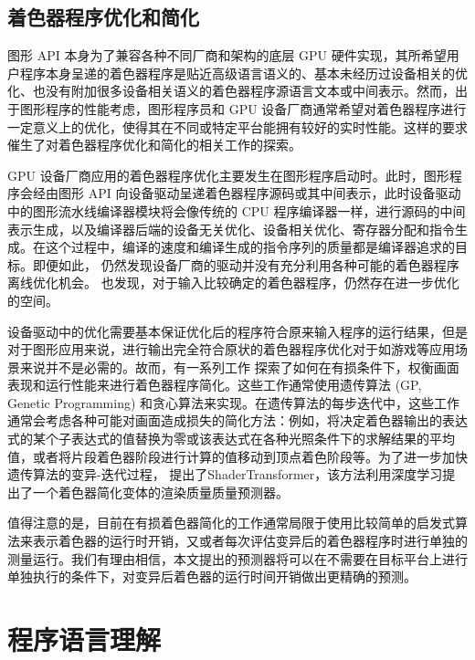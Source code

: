 \subsection{着色器程序优化和简化}

图形 API 本身为了兼容各种不同厂商和架构的底层 GPU 硬件实现，其所希望用户程序本身呈递的着色器程序是贴近高级语言语义的、基本未经历过设备相关的优化、也没有附加很多设备相关语义的着色器程序源语言文本或中间表示。然而，出于图形程序的性能考虑，图形程序员和 GPU 设备厂商通常希望对着色器程序进行一定意义上的优化，使得其在不同或特定平台能拥有较好的实时性能。这样的要求催生了对着色器程序优化和简化的相关工作的探索。

GPU 设备厂商应用的着色器程序优化主要发生在图形程序启动时。此时，图形程序会经由图形 API 向设备驱动呈递着色器程序源码或其中间表示，此时设备驱动中的图形流水线编译器模块将会像传统的 CPU 程序编译器一样，进行源码的中间表示生成，以及编译器后端的设备无关优化、设备相关优化、寄存器分配和指令生成。在这个过程中，编译的速度和编译生成的指令序列的质量都是编译器追求的目标。即便如此，\cite{8366956} 仍然发现设备厂商的驱动并没有充分利用各种可能的着色器程序离线优化机会。\cite{8891638} 也发现，对于输入比较确定的着色器程序，仍然存在进一步优化的空间。

设备驱动中的优化需要基本保证优化后的程序符合原来输入程序的运行结果，但是对于图形应用来说，进行输出完全符合原状的着色器程序优化对于如游戏等应用场景来说并不是必需的。故而，有一系列工作 \cite{10.1145/3528233.3530722, 10.1145/2661229.2661276, 10.1145/2070781.2024186, 10.1145/2816795.2818104, 9815871} 探索了如何在有损条件下，权衡画面表现和运行性能来进行着色器程序简化。这些工作通常使用遗传算法 (GP, Genetic Programming) 和贪心算法来实现。在遗传算法的每步迭代中，这些工作通常会考虑各种可能对画面造成损失的简化方法：例如，将决定着色器输出的表达式的某个子表达式的值替换为零或该表达式在各种光照条件下的求解结果的平均值，或者将片段着色器阶段进行计算的值移动到顶点着色阶段等。为了进一步加快遗传算法的变异-迭代过程，\citet{10.1145/3528233.3530722} 提出了ShaderTransformer，该方法利用深度学习提出了一个着色器简化变体的渲染质量质量预测器。

值得注意的是，目前在有损着色器简化的工作通常局限于使用比较简单的启发式算法来表示着色器的运行时开销\cite{10.1145/2816795.2818104, 10.1111/cgf.13482, 10.1145/3528233.3530722}，又或者每次评估变异后的着色器程序时进行单独的测量运行\cite{10.1145/2661229.2661276}。我们有理由相信，本文提出的预测器将可以在不需要在目标平台上进行单独执行的条件下，对变异后着色器的运行时间开销做出更精确的预测。

\section{程序语言理解}

